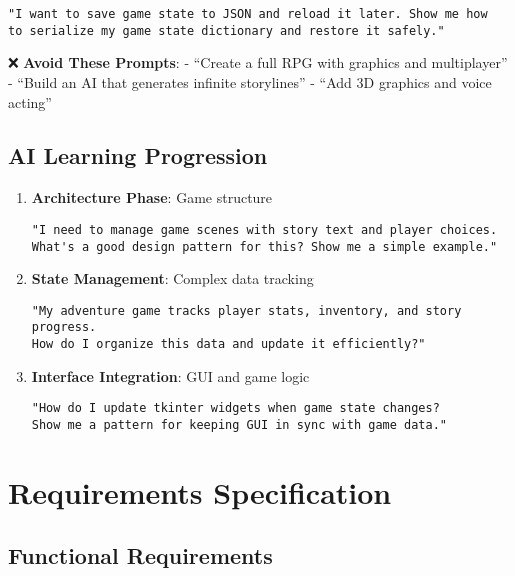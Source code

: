 \documentclass[
  letterpaper,
  DIV=11,
  numbers=noendperiod,
  oneside]{scrreprt}
\begin{document}
\begin{verbatim}
"I want to save game state to JSON and reload it later. Show me how 
to serialize my game state dictionary and restore it safely."
\end{verbatim}

❌ \textbf{Avoid These Prompts}: - ``Create a full RPG with graphics and
multiplayer'' - ``Build an AI that generates infinite storylines'' -
``Add 3D graphics and voice acting''

\subsection{AI Learning Progression}\label{ai-learning-progression-10}

\begin{enumerate}
\def\labelenumi{\arabic{enumi}.}
\item
  \textbf{Architecture Phase}: Game structure

\begin{verbatim}
"I need to manage game scenes with story text and player choices. 
What's a good design pattern for this? Show me a simple example."
\end{verbatim}
\item
  \textbf{State Management}: Complex data tracking

\begin{verbatim}
"My adventure game tracks player stats, inventory, and story progress. 
How do I organize this data and update it efficiently?"
\end{verbatim}
\item
  \textbf{Interface Integration}: GUI and game logic

\begin{verbatim}
"How do I update tkinter widgets when game state changes? 
Show me a pattern for keeping GUI in sync with game data."
\end{verbatim}
\end{enumerate}

\section{Requirements
Specification}\label{requirements-specification-10}

\subsection{Functional Requirements}\label{functional-requirements-10}
\end{document}
